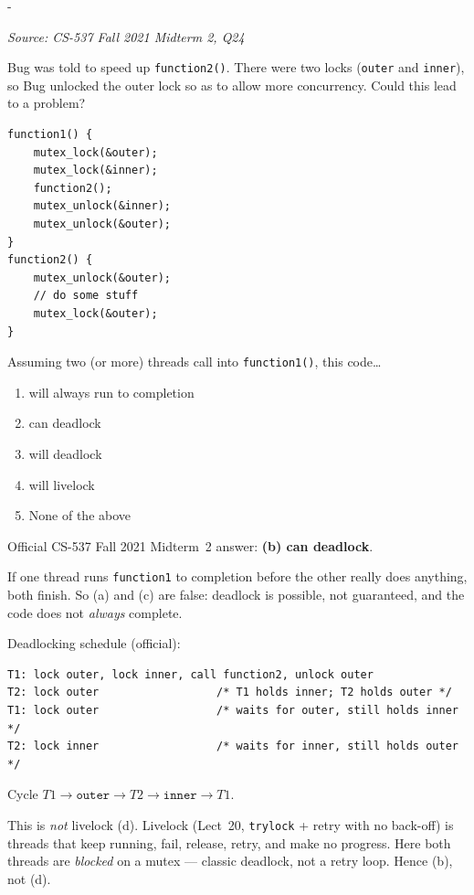 \documentclass[11pt,a4paper]{article}
\makeatletter
\newcommand{\keepspace}[1]{\par\penalty-100\begingroup
  \setlength{\dimen@}{#1}\dimen@ii\pagegoal\advance\dimen@ii-\pagetotal
  \ifdim\dimen@>\dimen@ii\ifdim\dimen@ii>\z@\vfil\fi\break\fi\endgroup}
\newcounter{qn}[section]
\newenvironment{Qn}[4]{%
  \refstepcounter{qn}\keepspace{7\baselineskip}%
  \begin{tcolorbox}[qboxstyle, title={Q\thesection.\theqn\ \ [#1 \textbar\ #2]\ \ #4}]%
  {\footnotesize\color{g3}\textit{Source: #3}}\par\smallskip%
}{%
  \end{tcolorbox}%
}
\newenvironment{Sol}{%
  \begin{tcolorbox}[sboxstyle, title={Solution}]%
}{%
  \end{tcolorbox}\vspace{0.35em}%
}
\makeatother
\begin{document}
\begin{Qn}{Medium-Hard}{Lect 20}{CS-537 Fall 2021 Midterm 2, Q24}{Unlocking \texttt{outer} inside \texttt{function2}: deadlock or livelock?}
Bug was told to speed up \texttt{function2()}. There were two locks
(\texttt{outer} and \texttt{inner}), so Bug unlocked the outer lock so as
to allow more concurrency. Could this lead to a problem?
\begin{lstlisting}[numbers=none]
function1() {
    mutex_lock(&outer);
    mutex_lock(&inner);
    function2();
    mutex_unlock(&inner);
    mutex_unlock(&outer);
}
function2() {
    mutex_unlock(&outer);
    // do some stuff
    mutex_lock(&outer);
}
\end{lstlisting}
Assuming two (or more) threads call into \texttt{function1()}, this
code\ldots
\begin{enumerate}
  \item[(a)] will always run to completion
  \item[(b)] can deadlock
  \item[(c)] will deadlock
  \item[(d)] will livelock
  \item[(e)] None of the above
\end{enumerate}
\end{Qn}
\begin{Sol}
Official CS-537 Fall 2021 Midterm~2 answer: \textbf{(b) can deadlock}.

If one thread runs \texttt{function1} to completion before the other
really does anything, both finish. So (a) and (c) are false: deadlock is
possible, not guaranteed, and the code does not \emph{always} complete.

Deadlocking schedule (official):
\begin{lstlisting}[numbers=none]
T1: lock outer, lock inner, call function2, unlock outer
T2: lock outer                  /* T1 holds inner; T2 holds outer */
T1: lock outer                  /* waits for outer, still holds inner */
T2: lock inner                  /* waits for inner, still holds outer */
\end{lstlisting}
Cycle $T1 \to \texttt{outer} \to T2 \to \texttt{inner} \to T1$.

This is \emph{not} livelock (d). Livelock (Lect~20, \texttt{trylock} +
retry with no back-off) is threads that keep running, fail, release,
retry, and make no progress. Here both threads are \emph{blocked} on a
mutex --- classic deadlock, not a retry loop. Hence (b), not (d).
\end{Sol}
\end{document}
